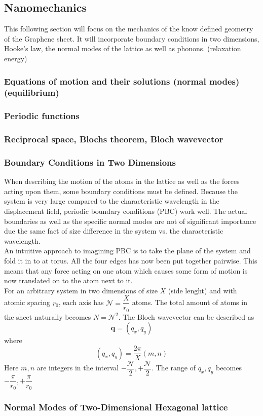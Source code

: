 
\subsection{Nanomechanics}
This following section will focus on the mechanics of the know defined geometry of the Graphene sheet. It will incorporate boundary conditions in two dimensions, Hooke's law, the normal modes of the lattice as well as phonons. (relaxation energy)
\subsubsection{Equations of motion and their solutions (normal modes)(equilibrium)}

\subsubsection{Periodic functions}
\subsubsection{Reciprocal space, Blochs theorem, Bloch wavevector}

\subsubsection{Boundary Conditions in Two Dimensions}

When describing the motion of the atoms in the lattice as well as the forces acting upon them, some boundary conditions must be defined. Because the system is very large compared to the characteristic wavelength in the displacement field, periodic boundary conditions (PBC) work well. The actual boundaries as well as the specific normal modes are not of significant importance due the same fact of size difference in the system vs. the characteristic wavelength. \\ 
An intuitive approach to imagining PBC is to take the plane of the system and fold it in to at torus. All the four edges has now been put together pairwise. This means that any force acting on one atom which causes some form of motion is now translated on to the atom next to it.\\
For an arbitrary system in two dimensions of size $X$ (side lenght) and with atomic spacing $r_{0}$, each axis has $\mathcal{N}=\dfrac{X}{r_{0}}$ atoms. The total amount of atoms in the sheet naturally becomes $N=\mathcal{N}^{2}$. The Bloch wavevector can be described as 
\begin{equation}
     \mathbf{q}=(q_{x},q_{y})
\end{equation}
where 
\begin{equation}
     (q_{x},q_{y})=\dfrac{2\pi}{X}(m,n)
\end{equation}
Here $m,n$ are integers in the interval $-\dfrac{\mathcal{N}}{2}, +\dfrac{\mathcal{N}}{2}$. The range of $q_{x},q_{y}$ becomes $-\dfrac{\pi}{r_{0}},+\dfrac{\pi}{r_{0}}$ 

\subsubsection{Normal Modes of Two-Dimensional Hexagonal lattice}


 